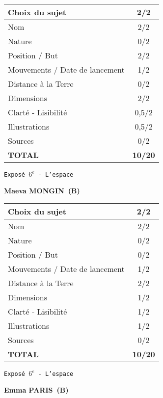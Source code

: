 	\vspace*{2cm}
	\begin{tabular}{|l|c|}
		\hline
		Choix du sujet & 2/2 \\
		\hline
		Nom & 2/2 \\
		\hline
		Nature & 0/2 \\
		\hline
		Position / But & 2/2 \\
		\hline
		Mouvements / Date de lancement & 1/2 \\
		\hline
		Distance \`a la Terre & 0/2 \\
		\hline
		Dimensions & 2/2 \\
		\hline
		Clart\'e - Lisibilit\'e & 0,5/2 \\
		\hline
		Illustrations & 0,5/2 \\
		\hline
		Sources & 0/2 \\
		\hline
		\textbf{TOTAL}  & \textbf{10/20} \\
		\hline
	\end{tabular}
	\newline
	\LARGE{\texttt{Expos\'e $6^e$ - L'espace}}
	\vspace*{1cm}

	\textbf{Maeva MONGIN\ (B)}

	\vspace*{2cm}
	\begin{tabular}{|l|c|}
		\hline
		Choix du sujet & 2/2 \\
		\hline
		Nom & 2/2 \\
		\hline
		Nature & 0/2 \\
		\hline
		Position / But & 0/2 \\
		\hline
		Mouvements / Date de lancement & 1/2 \\
		\hline
		Distance \`a la Terre & 2/2 \\
		\hline
		Dimensions & 1/2 \\
		\hline
		Clart\'e - Lisibilit\'e & 1/2 \\
		\hline
		Illustrations & 1/2 \\
		\hline
		Sources & 0/2 \\
		\hline
		\textbf{TOTAL}  & \textbf{10/20} \\
		\hline
	\end{tabular}
	\newline
	\LARGE{\texttt{Expos\'e $6^e$ - L'espace}}
	\vspace*{1cm}

	\textbf{Emma PARIS\ (B)}

